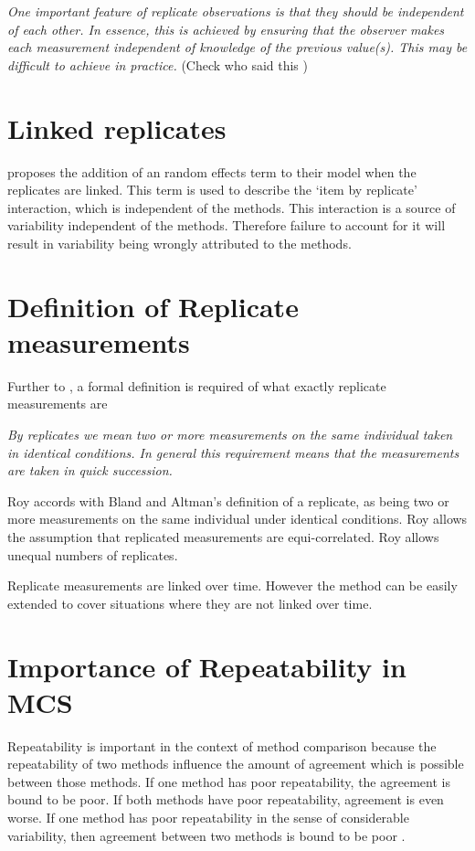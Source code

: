 \documentclass[12pt, a4paper]{report}
\theoremstyle{plain}
\theoremstyle{definition}
\theoremstyle{remark}
\begin{document}
	
	
	\emph{
		One important feature of replicate observations is that they should be independent
		of each other. In essence, this is achieved by ensuring that the observer makes each
		measurement independent of knowledge of the previous value(s). This may be difficult
		to achieve in practice.} (Check who said this
	)
	
	\section{Linked replicates}
	
	\citet{BXC2008} proposes the addition of an random effects term to their model when the replicates are linked. This term is used to describe the `item by replicate' interaction, which is independent of the methods. This interaction is a source of variability independent of the methods. Therefore failure to account for it will result in variability being wrongly attributed to the methods.
	

	
	
	\section{Definition of Replicate measurements}
	Further to \citet{BA99}, a formal definition is required of what exactly replicate measurements are
	
	\emph{By replicates we mean two or more measurements on the same
		individual taken in identical conditions. In general this requirement means that the
		measurements are taken in quick succession.}
	
	Roy accords with Bland and Altman's definition of a replicate, as being two or more measurements on the same individual under identical conditions. Roy allows the assumption that replicated measurements are equi-correlated. Roy allows unequal numbers of replicates.
	
	Replicate measurements are linked over time. However the method can be easily extended to cover situations where they are not linked over time.

	\section{Importance of Repeatability in MCS}
	
	Repeatability is important in the context of method comparison because the repeatability of two methods influence the amount of agreement which is possible between those methods. If one method has poor repeatability, the agreement is bound to be poor. If both methods have poor repeatability, agreement is even worse. If one method has poor repeatability in the sense of considerable variability, then agreement between two methods is bound to be poor \citep{ARoy2009}.
	
\end{document}
